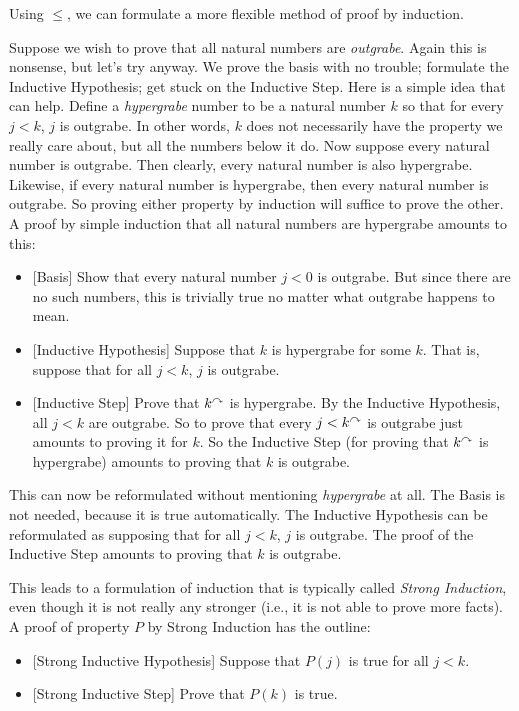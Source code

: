 Using $\leq$, we can formulate a more flexible method of proof by induction.

Suppose we wish to prove that all natural numbers are \emph{outgrabe}.
Again this is nonsense, but let's try anyway. We prove the basis with no trouble; formulate the Inductive Hypothesis; get stuck on the Inductive Step.
Here is a simple idea that can help. 
Define a \emph{hypergrabe} number to be a natural number $k$ so that for every $j<k$, $j$ is outgrabe.
In other words, $k$ does not necessarily have the property we really care about, but all the numbers below it do.
Now suppose every natural number is outgrabe.
Then clearly, every natural number is also hypergrabe.
Likewise, if every natural number is hypergrabe, then every natural number is outgrabe.
So proving either property by induction will suffice to prove the other.
A proof by simple induction that all natural numbers are hypergrabe amounts to this:
\begin{itemize}
	\item{}[Basis] Show that every natural number $j<0$ is outgrabe. But since there are no such numbers, this is trivially true no matter what outgrabe happens to mean.
	\item{}[Inductive Hypothesis] Suppose that $k$ is hypergrabe for some $k$.
	That is, suppose that for all $j<k$, $j$ is outgrabe.
	\item{}[Inductive Step] Prove that $k^\curvearrowright$ is hypergrabe.
	By the Inductive Hypothesis, all $j<k$ are outgrabe.
	So to prove that every $j<k^\curvearrowright$ is outgrabe just amounts to
  proving it for $k$.
  So the Inductive Step (for proving that $k^\curvearrowright$ is hypergrabe) amounts to proving that $k$ is outgrabe. 
\end{itemize}

This can now be reformulated without mentioning \emph{hypergrabe} at
all.  
The Basis is not needed, because it is true automatically.  
The Inductive Hypothesis can be reformulated as supposing that for all $j<k$, $j$ is outgrabe. 
The proof of the Inductive Step amounts to proving that $k$ is outgrabe.

This leads to a formulation of induction that is typically called
\emph{Strong Induction}, even though it is not really any stronger (i.e., it is not able to prove more facts).
A proof of property $P$ by Strong Induction has the outline:
\begin{itemize}
\item{}[Strong Inductive Hypothesis] Suppose that $P(j)$ is true for all $j<k$.
\item{}[Strong Inductive Step] Prove that $P(k)$ is true.
\end{itemize}

